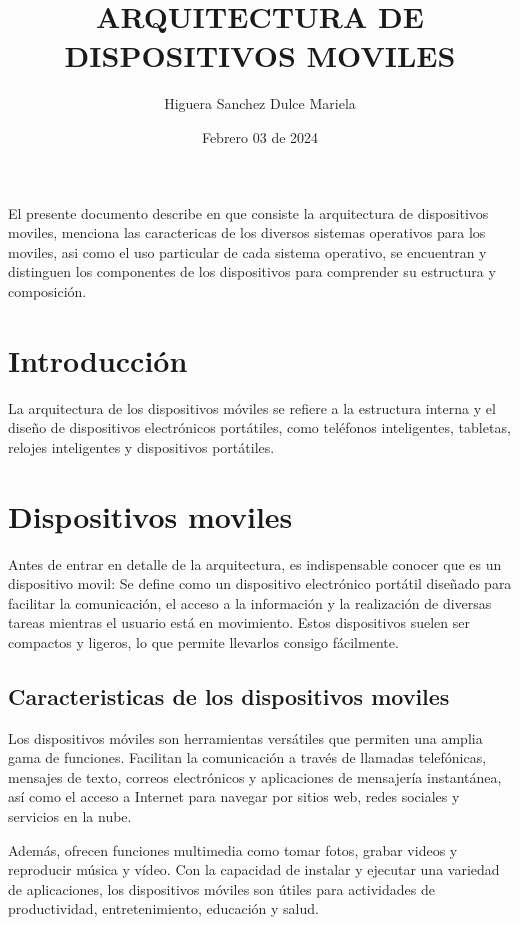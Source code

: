 \documentclass{article}
\title{ARQUITECTURA DE DISPOSITIVOS MOVILES}
\author{Higuera Sanchez Dulce Mariela}
\date{Febrero 03 de 2024}
\begin{document}
 
	
	\maketitle El presente documento describe en que consiste la arquitectura de dispositivos moviles,  menciona las caractericas de los diversos sistemas operativos para los moviles, asi como el uso particular de cada sistema operativo, se encuentran y distinguen los componentes de los dispositivos para comprender su estructura y composición.
	
	\begin{multicols}{2}
		\section{Introducción}
		La arquitectura de los dispositivos móviles se refiere a la estructura interna y el diseño de dispositivos electrónicos portátiles, como teléfonos inteligentes, tabletas, relojes inteligentes y dispositivos portátiles.
		
		\section{Dispositivos moviles}
Antes de entrar en detalle de la arquitectura, es indispensable conocer que es un dispositivo movil: Se define como un dispositivo electrónico portátil diseñado para facilitar la comunicación, el acceso a la información y la realización de diversas tareas mientras el usuario está en movimiento. Estos dispositivos suelen ser compactos y ligeros, lo que permite llevarlos consigo fácilmente.		
		\subsection{Caracteristicas de los dispositivos moviles}
		
		Los dispositivos móviles son herramientas versátiles que permiten una amplia gama de funciones. Facilitan la comunicación a través de llamadas telefónicas, mensajes de texto, correos electrónicos y aplicaciones de mensajería instantánea, así como el acceso a Internet para navegar por sitios web, redes sociales y servicios en la nube. 
		
		Además, ofrecen funciones multimedia como tomar fotos, grabar videos y reproducir música y vídeo. Con la capacidad de instalar y ejecutar una variedad de aplicaciones, los dispositivos móviles son útiles para actividades de productividad, entretenimiento, educación y salud. 
		

\end{multicols}
\end{document}
